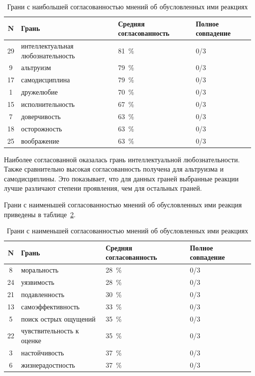\begin{table}[H]
	\centering
	\small
	\caption{Грани с наибольшей согласованностью мнений об обусловленных ими реакциях}
	\label{tbl:best_facets}
	\begin{tabularx}{\textwidth}{|c|X|p{}|p{}|}
		\hline
		\textbf{N} & \textbf{Грань} & \centering\textbf{Средняя согласованность} & \centering\arraybackslash\textbf{Полное совпадение} \\
		\hline
		29 & интеллектуальная любознательность & 81~\% & 0/3 \\
		\hline
		9 & альтруизм & 79~\% & 0/3 \\
		\hline
		17 & самодисциплина & 79~\% & 0/3 \\
		\hline
		1 & дружелюбие & 70~\% & 0/3 \\
		\hline
		15 & исполнительность & 67~\% & 0/3 \\
		\hline
		7 & доверчивость & 63~\% & 0/3 \\
		\hline
		18 & осторожность & 63~\% & 0/3 \\
		\hline
		25 & воображение & 63~\% & 0/3 \\
		\hline
	\end{tabularx}
\end{table}

Наиболее согласованной оказалась грань интеллектуальной любознательности.
Также сравнительно высокая согласованность получена для альтруизма и самодисциплины.
Это показывает, что для данных граней выбранные реакции лучше различают степени проявления, чем для остальных граней.

Грани с наименьшей согласованностью мнений об обусловленных ими реакция приведены в таблице~\ref{tbl:weak_facets}.

\begin{table}[H]
	\centering
	\small
	\caption{Грани с наименьшей согласованностью мнений об обусловленных ими реакциях}
	\label{tbl:weak_facets}
	\begin{tabularx}{\textwidth}{|c|X|p{}|p{}|}
		\hline
		\textbf{N} & \textbf{Грань} & \centering\textbf{Средняя согласованность} & \centering\arraybackslash\textbf{Полное совпадение} \\
		\hline
		8 & моральность & 28~\% & 0/3 \\
		\hline
		24 & уязвимость & 28~\% & 0/3 \\
		\hline
		21 & подавленность & 30~\% & 0/3 \\
		\hline
		13 & самоэффективность & 33~\% & 0/3 \\
		\hline
		5 & поиск острых ощущений & 35~\% & 0/3 \\
		\hline
		22 & чувствительность к оценке & 35~\% & 0/3 \\
		\hline
		3 & настойчивость & 37~\% & 0/3 \\
		\hline
		6 & жизнерадостность & 37~\% & 0/3 \\
		\hline
	\end{tabularx}
\end{table}

